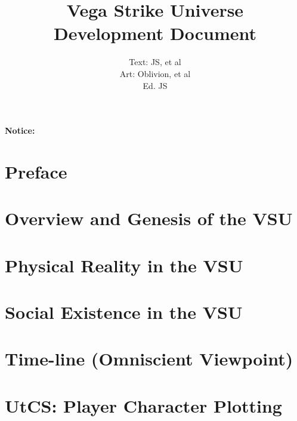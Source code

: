 

\title{Vega Strike Universe \\ 
Development Document}

\author{Text: JS, et al\\
Art: Oblivion, et al \\
Ed. JS}

\renewcommand{\thepage}{\roman{page}}
\maketitle
\renewcommand{\thepage}{\arabic{page}}
\thispagestyle{empty}
\centerline{\bf {\Huge Notice:}}
{\it

}

\setcounter{tocdepth}{2}
\clearpage
{}
\tableofcontents
\listoftables
{}
\listoffigures
{}

\chapter*{Preface}


\chapter{Overview and Genesis of the VSU}


\chapter{Physical Reality in the VSU}


\chapter{Social Existence in the VSU}


\chapter{Time-line (Omniscient Viewpoint)}


\chapter{UtCS: Player Character Plotting}


